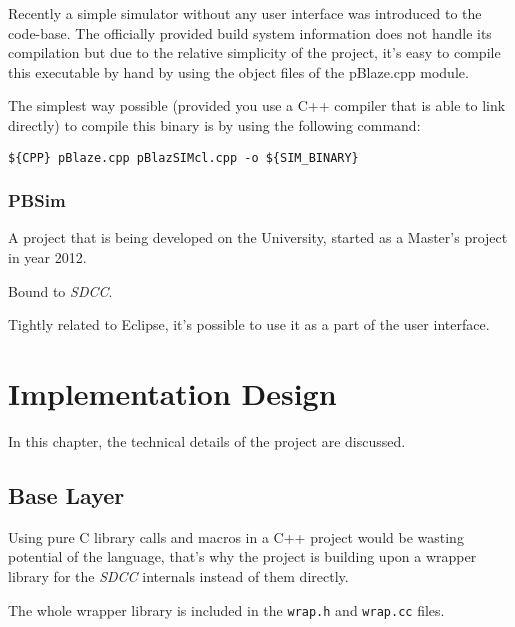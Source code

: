             Recently a simple simulator without any user interface was introduced to the code-base. The officially provided build system information does not handle its compilation but due to the relative simplicity of the project, it's easy to compile this executable by hand by using the object files of the pBlaze.cpp module.

            The simplest way possible (provided you use a C++ compiler that is able to link directly) to compile this binary is by using the following command:

            \begin{center}
                \texttt{\$\{CPP\} pBlaze.cpp pBlazSIMcl.cpp -o \$\{SIM\_BINARY\}}
            \end{center}

        \subsection{PBSim}\label{pbsim}


        A project that is being developed on the University, started as a Master's project in year 2012.

        Bound to \emph{SDCC}.

        Tightly related to Eclipse, it's possible to use it as a part of the user interface.




\chapter{Implementation Design}\label{design}

In this chapter, the technical details of the project are discussed.


    \section{Base Layer}

    Using pure C library calls and macros in a C++ project would be wasting potential of the language, that's why the project is building upon a wrapper library for the \emph{SDCC} internals instead of them directly.

    The whole wrapper library is included in the \texttt{wrap.h} and \texttt{wrap.cc} files.

